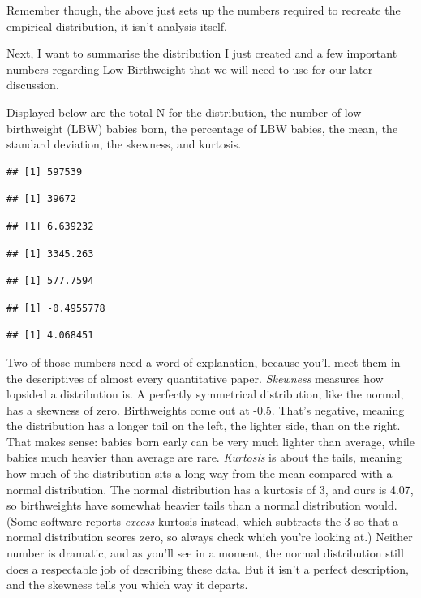 \documentclass[
]{book}
\begin{document}
Remember though, the above just sets up the numbers required to recreate the empirical distribution, it isn't analysis itself.

Next, I want to summarise the distribution I just created and a few important numbers regarding Low Birthweight that we will need to use for our later discussion.

Displayed below are the total N for the distribution, the number of low birthweight (LBW) babies born, the percentage of LBW babies, the mean, the standard deviation, the skewness, and kurtosis.

\begin{verbatim}
## [1] 597539
\end{verbatim}

\begin{verbatim}
## [1] 39672
\end{verbatim}

\begin{verbatim}
## [1] 6.639232
\end{verbatim}

\begin{verbatim}
## [1] 3345.263
\end{verbatim}

\begin{verbatim}
## [1] 577.7594
\end{verbatim}

\begin{verbatim}
## [1] -0.4955778
\end{verbatim}

\begin{verbatim}
## [1] 4.068451
\end{verbatim}

Two of those numbers need a word of explanation, because you'll meet them in the descriptives of almost every quantitative paper. \emph{Skewness} measures how lopsided a distribution is. A perfectly symmetrical distribution, like the normal, has a skewness of zero. Birthweights come out at -0.5. That's negative, meaning the distribution has a longer tail on the left, the lighter side, than on the right. That makes sense: babies born early can be very much lighter than average, while babies much heavier than average are rare. \emph{Kurtosis} is about the tails, meaning how much of the distribution sits a long way from the mean compared with a normal distribution. The normal distribution has a kurtosis of 3, and ours is 4.07, so birthweights have somewhat heavier tails than a normal distribution would. (Some software reports \emph{excess} kurtosis instead, which subtracts the 3 so that a normal distribution scores zero, so always check which you're looking at.) Neither number is dramatic, and as you'll see in a moment, the normal distribution still does a respectable job of describing these data. But it isn't a perfect description, and the skewness tells you which way it departs.
\end{document}
